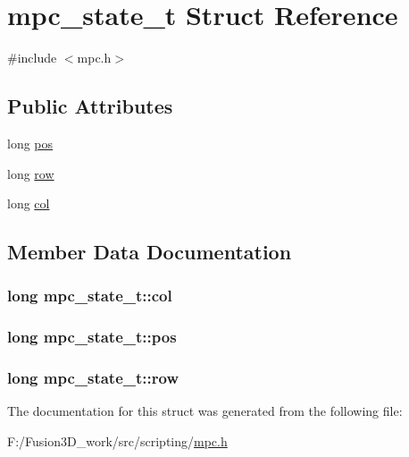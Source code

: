 \hypertarget{structmpc__state__t}{}\section{mpc\+\_\+state\+\_\+t Struct Reference}
\label{structmpc__state__t}


{\ttfamily \#include $<$mpc.\+h$>$}

\subsection*{Public Attributes}
\begin{DoxyCompactItemize}
\item 
long \hyperlink{structmpc__state__t_ae0a96476d66bcde484ce1025fb756208}{pos}
\item 
long \hyperlink{structmpc__state__t_afedbe5413b2b461a0bd2f875b26d007f}{row}
\item 
long \hyperlink{structmpc__state__t_a9a693c1ebea3a4b4f4494c65b7567205}{col}
\end{DoxyCompactItemize}


\subsection{Member Data Documentation}
\hypertarget{structmpc__state__t_a9a693c1ebea3a4b4f4494c65b7567205}{}
\subsubsection[{col}]{\setlength{\rightskip}{0pt plus 5cm}long mpc\+\_\+state\+\_\+t\+::col}\label{structmpc__state__t_a9a693c1ebea3a4b4f4494c65b7567205}
\hypertarget{structmpc__state__t_ae0a96476d66bcde484ce1025fb756208}{}
\subsubsection[{pos}]{\setlength{\rightskip}{0pt plus 5cm}long mpc\+\_\+state\+\_\+t\+::pos}\label{structmpc__state__t_ae0a96476d66bcde484ce1025fb756208}
\hypertarget{structmpc__state__t_afedbe5413b2b461a0bd2f875b26d007f}{}
\subsubsection[{row}]{\setlength{\rightskip}{0pt plus 5cm}long mpc\+\_\+state\+\_\+t\+::row}\label{structmpc__state__t_afedbe5413b2b461a0bd2f875b26d007f}


The documentation for this struct was generated from the following file\+:\begin{DoxyCompactItemize}
\item 
F\+:/\+Fusion3\+D\+\_\+work/src/scripting/\hyperlink{mpc_8h}{mpc.\+h}\end{DoxyCompactItemize}
